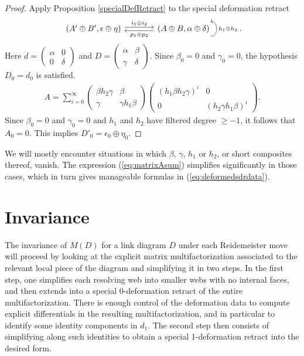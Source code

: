 \documentclass{article}
\newcommand{\sdr}[5]{%
  \begin{tikzcd}[column sep=large, ampersand replacement=\&]
    {#1} \arrow[r, "{#3}", shift left=0.5ex,] \arrow[r, leftarrow, "{#4}", shift right=0.5ex, swap] \& 
    #2 \arrow[loop right, distance=1em, in=15, out=-15, "{#5}",swap]
  \end{tikzcd}%
}
\theoremstyle{plain} %
\theoremstyle{definition} %
\theoremstyle{remark} %
\begin{document}
\begin{proof}
	Apply Proposition \ref{specialDefRetract} to the special deformation retract 
	$$\sdr{(A'\oplus B',\epsilon\oplus \eta)}{(A\oplus B,\alpha\oplus \delta)}{i_1\oplus i_2}{p_1\oplus p_2}{h_1\oplus h_2}.$$
	Here $d=\begin{pmatrix}\alpha & 0\\ 0 & \delta \end{pmatrix}$ and $D=\begin{pmatrix}\alpha & \beta \\ \gamma & \delta \end{pmatrix}$. Since $\beta_0=0$ and $\gamma_0=0$, the hypothesis $D_0=d_0$ is satisfied. 
	\begin{align}\label{eq:matrixAsum}
		A= \sum_{i=0}^\infty\begin{pmatrix}
			\beta h_2\gamma& \beta \\ \gamma & \gamma h_1 \beta
		\end{pmatrix}\begin{pmatrix}
			(h_1\beta h_2\gamma)^i & 0\\ 0& (h_2\gamma h_1\beta )^i
		\end{pmatrix}.
	\end{align}
	Since $\beta_0=0$ and $\gamma_0=0$ and $h_1$ and $h_2$ have filtered degree $\geq-1$, it follows that $A_0=0$. This implies $D'_0=\epsilon_0\oplus \eta_0$.
\end{proof}
	
We will mostly encounter situations in which $\beta$, $\gamma$, $h_1$ or $h_2$, or short composites thereof, vanish. The expression (\ref{eq:matrixAsum}) simplifies significantly in those cases, which in turn gives manageable formulas in (\ref{eq:deformedsdrdata}).



 

\section{Invariance}

The invariance of $M(D)$ for a link diagram $D$ under each Reidemeister move will proceed by looking at the explicit matrix multifactorization associated to the relevant local piece of the diagram and simplifying it in two steps. In the first step, one simplifies each resolving web into smaller webs with no internal faces, and then extends into a special 0-deformation retract of the entire multifactorization. There is enough control of the deformation data to compute explicit differentials in the resulting multifactorization, and in particular to identify some identity components in $d_1$. The second step then consists of simplifying along such identities to obtain a special 1-deformation retract into the desired form.
\end{document}
